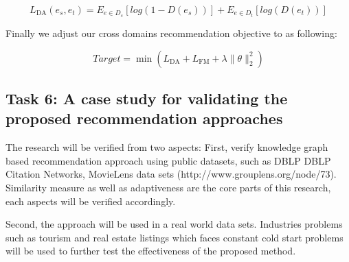 \begin{equation}
    L_\text{DA}(e_s,e_t)=E_{e \in D_s}[log(1-D(e_s))] + E_{e \in D_t}[log(D(e_t))]
\end{equation}

Finally we adjust our cross domains recommendation objective to as following:

\begin{equation}
    Target=\min{(L_\text{DA}+L_\text{FM}+\lambda\|\theta\|^2_2)}
\end{equation}

\subsection*{Task 6:  A case study for validating the proposed recommendation approaches}

The research will be verified from two aspects: 
First, verify knowledge graph based recommendation approach using public datasets, such as DBLP DBLP Citation Networks, MovieLens data sets (http://www.grouplens.org/node/73). Similarity measure as well as adaptiveness are the core parts of this research, each aspects will be verified accordingly.

Second, the approach will be used in a real world data sets. Industries problems such as tourism and real estate listings which faces constant cold start problems will be used to further test the effectiveness of the proposed method.

